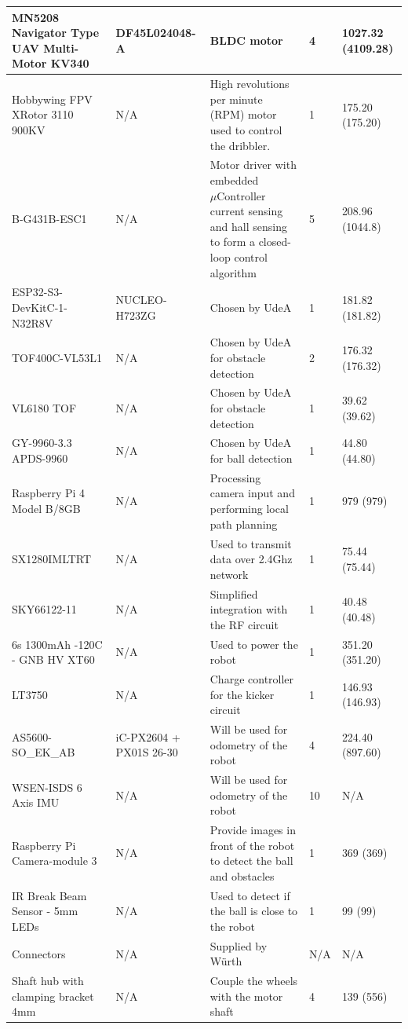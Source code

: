 \documentclass[a4paper,8pt]{article}
\begin{document}
\begin{small}
\begin{longtable}{|p{3cm}|p{3cm}|p{3cm}|p{1cm}|p{3cm}| }
      MN5208 Navigator Type UAV Multi-Motor KV340 & DF45L024048-A & BLDC motor & 4 & 1027.32 (4109.28)\\ \hline
      Hobbywing FPV XRotor 3110 900KV & N/A & High revolutions per minute (RPM) motor used to control the dribbler. & 1 & 175.20 (175.20) \\ \hline 
      B-G431B-ESC1 & N/A & Motor driver with embedded $\mu\text{Controller}$ current sensing and hall sensing to form a closed-loop control algorithm & 5 & 208.96 (1044.8)\\ \hline 
      ESP32-S3-DevKitC-1-N32R8V & NUCLEO-H723ZG & Chosen by UdeA & 1 & 181.82 (181.82) \\ \hline 
      TOF400C-VL53L1 & N/A & Chosen by UdeA for obstacle detection & 2 & 176.32 (176.32) \\ \hline
      VL6180 TOF & N/A & Chosen by UdeA for obstacle detection & 1 & 39.62 (39.62) \\ \hline
      GY-9960-3.3 APDS-9960 & N/A & Chosen by UdeA for ball detection & 1 & 44.80 (44.80) \\ \hline
      Raspberry Pi 4 Model B/8GB & N/A & Processing camera input and performing local path planning & 1 & 979 (979) \\ \hline 
      SX1280IMLTRT & N/A & Used to transmit data over 2.4Ghz network & 1 & 75.44 (75.44) \\ \hline 
      SKY66122-11 & N/A & Simplified integration with the RF circuit & 1 & 40.48 (40.48) \\ \hline 
      6s 1300mAh -120C - GNB HV XT60 & N/A & Used to power the robot & 1 & 351.20 (351.20) \\ \hline 
      LT3750 & N/A & Charge controller for the kicker circuit & 1 & 146.93 (146.93)\\ \hline
      AS5600-SO\_EK\_AB & iC-PX2604 + PX01S 26-30 & Will be used for odometry of the robot & 4 & 224.40 (897.60) \\ \hline 
      WSEN-ISDS 6 Axis IMU & N/A & Will be used for odometry of the robot & 10 & N/A\\ \hline 
      Raspberry Pi Camera-module 3 & N/A & Provide images in front of the robot to detect the ball and obstacles & 1 & 369 (369) \\ \hline 
      IR Break Beam Sensor - 5mm LEDs & N/A & Used to detect if the ball is close to the robot & 1 & 99 (99) \\ \hline 
      Connectors & N/A & Supplied by Würth & N/A & N/A \\ \hline 
      Shaft hub with clamping bracket 4mm & N/A & Couple the wheels with the motor shaft & 4 & 139 (556) \\ \hline 

\end{longtable}
\end{small}
\end{document}
